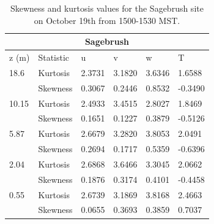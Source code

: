 \documentclass[]{article}
\begin{document}
\begin{table}
\begin{tabular}{ |p{1cm}|p{2cm}|p{1cm}|p{1cm}|p{1cm}| p{1.5cm}|}

		\hline
		\multicolumn{6}{|c|}{Sagebrush} \\
		\hline\hline
		z (m) & Statistic & u &  v & w & T\\
		\hline
		18.6 & Kurtosis & 2.3731 & 3.1820 & 3.6346&  1.6588\\
		&Skewness & 0.3067 & 0.2446 & 0.8532 & -0.3490\\
		\hline
		10.15 & Kurtosis & 2.4933 & 3.4515 & 2.8027 &1.8469 \\
		&Skewness & 0.1651 & 0.1227 & 0.3879& -0.5126\\
        \hline
       	5.87 & Kurtosis & 2.6679 & 3.2820 & 3.8053 &2.0491 \\
       	&Skewness & 0.2694 & 0.1717 & 0.5359 & -0.6396\\
       	\hline
   		2.04 & Kurtosis & \cellcolor{red!25} 2.6868 & 3.6466  & 3.3045 & 2.0662  \\
   		&Skewness & \cellcolor{blue!25} 0.1876 & 0.3174 & 0.4101& -0.4458\\
   		\hline
		0.55 & Kurtosis & \cellcolor{red!25} 2.6739 & 3.1869 & 3.8168  & 2.4663\\
		&Skewness &\cellcolor{blue!25} 0.0655 & 0.3693 & 0.3859&0.7037\\
		\hline
		
\end{tabular}
\caption{Skewness and kurtosis values for the Sagebrush site on October 19th from 1500-1530 MST. }
\label{tab:kurt_sage}
\end{table}
\end{document}
